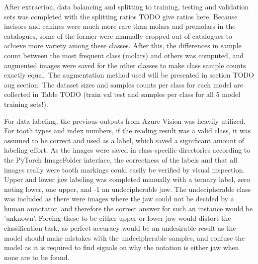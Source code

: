 \documentclass{article}
\begin{document}
After extraction, data balancing and splitting to training, testing and validation sets 
was completed with the splitting ratios TODO give ratios here.
Because incisors and canines were much more rare 
than molars and premolars in the catalogues, some of the former were manually cropped out 
of catalogues to achieve more variety among these classes. After this, the differences 
in sample count between the most frequent class (molars) and others was computed, and augmented 
images were saved for the other classes to make class sample counts exactly equal. The augmentation 
method used will be presented in section TODO aug section. The dataset sizes and samples counts per class 
for each model are collected in Table TODO (train val test and samples per class for all 5 model training sets!).

For data labeling, the previous outputs from Azure Vision was heavily utilized. For 
tooth types and index numbers, if the reading result was a valid class, it was assumed to 
be correct and used as a label, which saved a significant amount of labeling effort. As the 
images were saved in class-specific directories according to the PyTorch ImageFolder interface,
the correctness of the labels and that all images really were tooth markings could easily be verified by visual inspection. Upper and lower jaw labeling 
was completed manually with a ternary label, zero noting lower, one upper, and -1 an undecipherable jaw.
The undecipherable class was included as there were images where the jaw could not be decided by a human annotator, 
and therefore the correct answer for such an instance would be 'unknown'. Forcing these to be either upper or lower jaw 
would distort the classification task, as perfect accuracy would be an undesirable result as the model should 
make mistakes with the undecipherable samples, and confuse the model as it is required to find signals on why 
the notation is either jaw when none are to be found.
\end{document}
